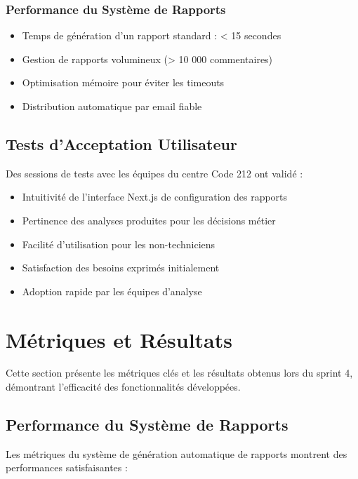 \subsubsection{Performance du Système de Rapports}
\begin{itemize}
    \item Temps de génération d'un rapport standard : < 15 secondes
    \item Gestion de rapports volumineux (> 10 000 commentaires)
    \item Optimisation mémoire pour éviter les timeouts
    \item Distribution automatique par email fiable
\end{itemize}

\subsection{Tests d'Acceptation Utilisateur}

Des sessions de tests avec les équipes du centre Code 212 ont validé :
\begin{itemize}
    \item Intuitivité de l'interface Next.js de configuration des rapports
    \item Pertinence des analyses produites pour les décisions métier
    \item Facilité d'utilisation pour les non-techniciens
    \item Satisfaction des besoins exprimés initialement
    \item Adoption rapide par les équipes d'analyse
\end{itemize}

\section{Métriques et Résultats}

Cette section présente les métriques clés et les résultats obtenus lors du sprint 4, démontrant l'efficacité des fonctionnalités développées.

\subsection{Performance du Système de Rapports}

Les métriques du système de génération automatique de rapports montrent des performances satisfaisantes :

